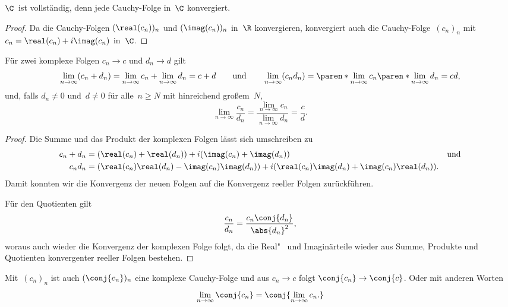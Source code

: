 \documentclass[a4paper]{article}
\begin{document}
\begin{corollary}
    $\C$~ist vollständig, denn jede Cauchy-Folge in~$\C$ konvergiert.
\end{corollary}

\begin{proof}
    Da die Cauchy-Folgen $(\real(c_n))_n$ und $(\imag(c_n))_n$ in~$\R$ konvergieren, konvergiert auch die Cauchy-Folge~$(c_n)_n$ mit $c_n = \real(c_n)+i\imag(c_n)$ in~$\C$.
\end{proof}


\begin{corollary}[Grenzwertsätze in~$\C$]
    Für zwei komplexe Folgen $c_n \to c$ und $d_n \to d$ gilt
    \begin{equation*}
        \lim_{n\to\infty} (c_n+d_n) = \lim_{n\to\infty} c_n + \lim_{n\to\infty} d_n = c+d \qquad\text{und}\qquad \lim_{n\to\infty} (c_nd_n) = \paren*{\lim_{n\to\infty} c_n} \paren*{\lim_{n\to\infty} d_n} = cd,
    \end{equation*}
    und, falls $d_n \neq 0$ und~$d \neq 0$ für alle~$n \geq N$ mit hinreichend großem~$N$,
    \begin{equation*}
        \lim_{n\to\infty} \frac{c_n}{d_n} = \frac{\lim_{n\to\infty} c_n}{\lim_{n\to\infty} d_n} = \frac{c}{d}.
    \end{equation*}
\end{corollary}

\begin{proof}
    Die Summe und das Produkt der komplexen Folgen lässt sich umschreiben zu
    \begin{align*}
        c_n+d_n &= (\real(c_n)+\real(d_n)) + i(\imag(c_n)+\imag(d_n)) &&\text{und} \\
        c_nd_n &= (\real(c_n)\real(d_n)-\imag(c_n)\imag(d_n)) + i(\real(c_n)\imag(d_n)+\imag(c_n)\real(d_n)).
    \end{align*}
    Damit konnten wir die Konvergenz der neuen Folgen auf die Konvergenz reeller Folgen zurückführen.

    Für den Quotienten gilt
    \begin{equation*}
        \frac{c_n}{d_n} = \frac{c_n\conj{d_n}}{\abs{d_n}^2},
    \end{equation*}
    woraus auch wieder die Konvergenz der komplexen Folge folgt, da die Real"~ und Imaginärteile wieder aus Summe, Produkte und Quotienten konvergenter reeller Folgen bestehen.
\end{proof}

\begin{corollary}\label{cor:complex:sequence:conjugate}
    Mit~$(c_n)_n$ ist auch $(\conj{c_n})_n$ eine komplexe Cauchy-Folge und aus $c_n \to c$ folgt $\conj{c_n} \to \conj{c}$. Oder mit anderen Worten
    \begin{equation*}
        \lim_{n\to\infty} \conj{c_n} = \conj{\lim_{n\to\infty} c_n.}
    \end{equation*}
\end{corollary}
\end{document}
